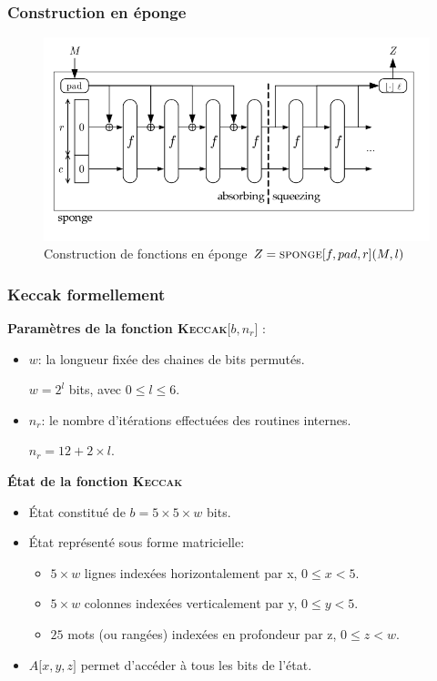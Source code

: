 \begin{frame}
  \frametitle{Construction en éponge}
  \vfill
\begin{figure}[H]
\centering
\includegraphics[scale=0.4]{sponge1.png}
\caption{Construction de fonctions en éponge $Z = \textsc{sponge}\lbrack f , pad, r\rbrack (M, l)$}
\end{figure}
  \vfill
\end{frame}

\begin{frame}
  \frametitle{Keccak formellement}
  \vfill
  
    \textbf{Paramètres de la fonction \textsc{Keccak}$\lbrack b, n_r \rbrack$ }:\\
  \begin{itemize}
  \item{ \textbf{$w$}: la longueur fixée des chaines de bits permutés.
  
  \hspace{1cm}$w=2^l$ bits, avec $0 \le l \le 6$.
  }
  \item{ \textbf{$n_r$}: le nombre d'itérations effectuées des routines internes.
  
  \hspace{1cm}$n_r = 12+2\times l$.
  }
  \end{itemize}
  \vspace{1cm}
  \textbf{État de la fonction \textsc{Keccak}}
\begin{itemize}
\item{État constitué de $b = 5 \times 5 \times w$ bits.}
\item{État représenté sous forme matricielle:
\begin{itemize}
\item $5\times w$ lignes indexées horizontalement par x, $0 \le x < 5$.
\item $5 \times w$ colonnes indexées verticalement par y, $0 \le y < 5$.
\item $25$ mots (ou rangées) indexées en profondeur par z, $0 \le z < w$.
\end{itemize}
}
\item{$A\lbrack x,y,z\rbrack$ permet d'accéder à tous les bits de l'état.}
\end{itemize}

  \vfill
\end{frame}

